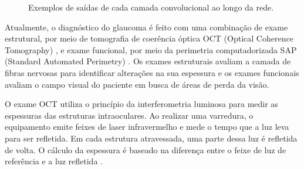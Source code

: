 \documentclass[conference]{IEEEtran}
\begin{document}
\begin{figure}[!t]
{  \label{fig:conv3}}
  \hfil
  \hfil
  \caption{Exemplos de saídas de cada camada convolucional ao longo da rede.}
  \label{fig:imagens_rede}
\end{figure}


Atualmente, o diagnóstico do glaucoma é feito com uma combinação de exame estrutural, por meio de tomografia de coerência óptica OCT (Optical Coherence Tomography) \cite{Wollstein2005}, e exame funcional, por meio da perimetria computadorizada SAP (Standard Automated Perimetry) \cite{chauhan1990}. Os exames estruturais avaliam a camada de fibras nervosas para identificar alterações na sua espessura e os exames funcionais avaliam o campo visual do paciente em busca de áreas de perda da visão. 

O exame OCT utiliza o princípio da interferometria luminosa para medir as espessuras das estruturas intraoculares. Ao realizar uma varredura, o equipamento emite feixes de laser infravermelho e mede o tempo que a luz leva para ser refletida. Em cada estrutura atravessada, uma parte dessa luz é refletida de volta. O cálculo da espessura é baseado na diferença entre o feixe de luz de referência e a luz refletida \cite{huang1991}. 
\end{document}

